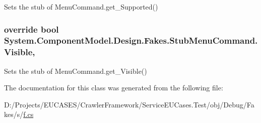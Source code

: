 Sets the stub of Menu\-Command.\-get\-\_\-\-Supported()

\hypertarget{class_system_1_1_component_model_1_1_design_1_1_fakes_1_1_stub_menu_command_a36a2ed3d62ef5e784163ab8448fe75e2}{
\subsubsection[{Visible}]{\setlength{\rightskip}{0pt plus 5cm}override bool System.\-Component\-Model.\-Design.\-Fakes.\-Stub\-Menu\-Command.\-Visible\hspace{0.3cm}{\ttfamily [get]}, {\ttfamily [set]}}}\label{class_system_1_1_component_model_1_1_design_1_1_fakes_1_1_stub_menu_command_a36a2ed3d62ef5e784163ab8448fe75e2}


Sets the stub of Menu\-Command.\-get\-\_\-\-Visible()



The documentation for this class was generated from the following file\-:\begin{DoxyCompactItemize}
\item 
D\-:/\-Projects/\-E\-U\-C\-A\-S\-E\-S/\-Crawler\-Framework/\-Service\-E\-U\-Cases.\-Test/obj/\-Debug/\-Fakes/s/\hyperlink{s_2f_8cs}{f.\-cs}\end{DoxyCompactItemize}
